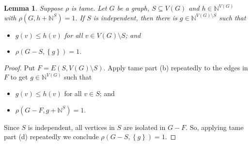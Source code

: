 \documentclass[12pt]{article}
\theoremstyle{plain}
\newtheorem{lem}[thm]{Lemma}
\theoremstyle{definition}
\theoremstyle{remark}
\newcommand{\IN}{\mathbb{N}}
\newcommand{\set}[1]{\left\{ #1 \right\}}
\begin{document}
\begin{lem}\label{CutOff}
	Suppose $\rho$ is tame. Let $G$ be a graph, $S \subseteq V(G)$ and $h \in \IN^{V(G)}$ with $\rho(G, h + \IN^S) = 1$.  If $S$ is independent, then there is $g \in \IN^{V(G) \setminus S}$ such that
	\begin{itemize}
		\item $g(v) \le h(v)$ for all $v \in V(G) \setminus S$; and
		\item $\rho(G - S, \set{g}) = 1$.
	\end{itemize}
\end{lem}
\begin{proof}
	Put $F = E(S, V(G) \setminus S)$. Apply tame part (b) repeatedly to the edges in $F$ to get $g \in \IN^{V(G)}$ such that
	\begin{itemize}
		\item $g(v) \le h(v)$ for all $v \in S$; and
		\item $\rho(G - F, g + \IN^S) = 1$.
	\end{itemize}
	Since $S$ is independent, all vertices in $S$ are isolated in $G-F$.  So, applying tame part (d) repeatedly we conclude $\rho(G - S, \set{g}) = 1$.
\end{proof}
\end{document}

